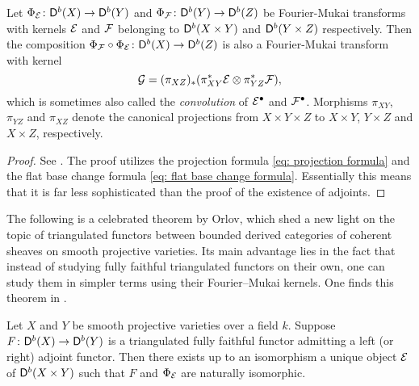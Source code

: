 \begin{proposition}
    \label{Composition of fm is fm}
    Let $\Phi_{\mathcal E} \colon \mathsf{D}^b(X) \to \mathsf{D}^b(Y)$ and $\Phi_{\mathcal F} \colon \mathsf{D}^b(Y) \to \mathsf{D}^b(Z)$ be Fourier-Mukai transforms with kernels $\mathcal E$ and $\mathcal F$ belonging to $\mathsf{D}^b(X \times Y)$ and $\mathsf{D}^b(Y \times Z)$ respectively. Then the composition $\Phi_{\mathcal F} \circ \Phi_{\mathcal E} \colon \mathsf{D}^b(X) \to \mathsf{D}^b(Z)$ is also a Fourier-Mukai transform with kernel
    \[
        \mathcal G = (\pi_{XZ})_*(\pi_{XY}^*\mathcal E \otimes \pi_{YZ}^*\mathcal F),
    \]
    which is sometimes also called the \emph{convolution} of $\mathcal E^\bullet$ and $\mathcal F^\bullet$. Morphisms $\pi_{XY}$, $\pi_{YZ}$ and $\pi_{XZ}$ denote the canonical projections from $X \times Y \times Z$ to $X \times Y$, $Y \times Z$ and $X \times Z$, respectively.
\end{proposition}

\begin{proof}
    See \cite[\S 5, 5.10]{huybrechts2006fouriermukai}. The proof utilizes the projection formula \eqref{eq: projection formula} and the flat base change formula \eqref{eq: flat base change formula}. Essentially this means that it is far less sophisticated than the proof of the existence of adjoints.    
\end{proof}

The following is a celebrated theorem by Orlov, which shed a new light on the topic of triangulated functors between bounded derived categories of coherent sheaves on smooth projective varieties. Its main advantage lies in the fact that instead of studying fully faithful triangulated functors on their own, one can study them in simpler terms using their Fourier--Mukai kernels. One finds this theorem in \cite[Theorem 3.2.2]{Orlov2003}.

\begin{theorem}
    \label{Orlov's theorem}
    Let $X$ and $Y$ be smooth projective varieties over a field $k$. Suppose $F \colon \mathsf{D}^b(X) \to \mathsf{D}^b(Y)$ is a triangulated fully faithful functor admitting a left (or right) adjoint functor. Then there exists up to an isomorphism a unique object $\mathcal E$ of $\mathsf{D}^b(X \times Y)$ such that $F$ and $\Phi_{\mathcal E}$ are naturally isomorphic.
\end{theorem}

